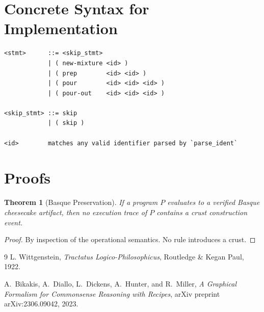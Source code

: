\documentclass[11pt, a4paper]{article}
\newtheorem{theorem}{Theorem}
\begin{document}
\section{Concrete Syntax for Implementation}
\label{conc-synt}
\begin{verbatim}
<stmt>      ::= <skip_stmt> 
            | ( new-mixture <id> )
            | ( prep        <id> <id> )
            | ( pour        <id> <id> <id> )
            | ( pour-out    <id> <id> <id> )

<skip_stmt> ::= skip 
            | ( skip )

<id>        matches any valid identifier parsed by `parse_ident`
\end{verbatim}

\section{Proofs}
\begin{theorem}[Basque Preservation]
If a program $P$ evaluates to a verified Basque cheesecake
artifact, then no execution trace of $P$ contains a crust
construction event.
\end{theorem}

\begin{proof}
By inspection of the operational semantics.
No rule introduces a crust.
\end{proof}

\newpage
\begin{thebibliography}{9}
      L. Wittgenstein,
      \emph{Tractatus Logico-Philosophicus},
      Routledge \& Kegan Paul, 1922.
    
      A.~Bikakis, A.~Diallo, L.~Dickens, A.~Hunter, and R.~Miller,
      \emph{A Graphical Formalism for Commonsense Reasoning with Recipes},
      arXiv preprint arXiv:2306.09042, 2023.
\end{thebibliography}
\end{document}
